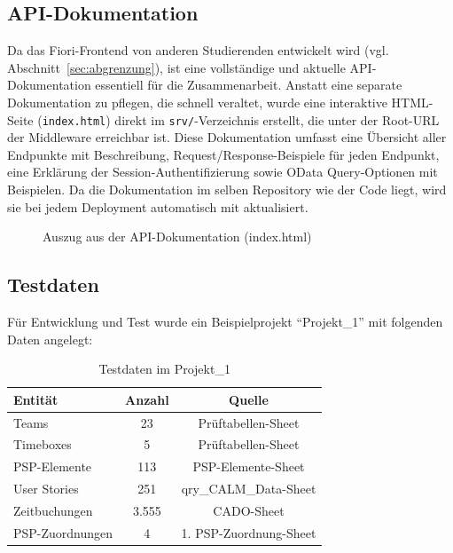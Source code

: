 \subsection{API-Dokumentation}

Da das Fiori-Frontend von anderen Studierenden entwickelt wird (vgl. Abschnitt~\ref{sec:abgrenzung}), ist eine vollständige und aktuelle API-Dokumentation essentiell für die Zusammenarbeit. Anstatt eine separate Dokumentation zu pflegen, die schnell veraltet, wurde eine interaktive HTML-Seite (\texttt{index.html}) direkt im \texttt{srv/}-Verzeichnis erstellt, die unter der Root-URL der Middleware erreichbar ist. Diese Dokumentation umfasst eine Übersicht aller Endpunkte mit Beschreibung, Request/Response-Beispiele für jeden Endpunkt, eine Erklärung der Session-Authentifizierung sowie OData Query-Optionen mit Beispielen. Da die Dokumentation im selben Repository wie der Code liegt, wird sie bei jedem Deployment automatisch mit aktualisiert.

\begin{figure}[H]
\centering
{}
\caption{Auszug aus der API-Dokumentation (index.html)}
\label{fig:api-doc}
\end{figure}

\subsection{Testdaten}

Für Entwicklung und Test wurde ein Beispielprojekt \enquote{Projekt\_1} mit folgenden Daten angelegt:

\begin{table}[H]
\centering
\caption{Testdaten im Projekt\_1}
\label{tab:testdata}
\begin{tabularx}{\textwidth}{Xcc}
\toprule
\textbf{Entität} & \textbf{Anzahl} & \textbf{Quelle} \\
\midrule
Teams & 23 & Prüftabellen-Sheet \\
Timeboxes & 5 & Prüftabellen-Sheet \\
PSP-Elemente & 113 & PSP-Elemente-Sheet \\
User Stories & 251 & qry\_CALM\_Data-Sheet \\
Zeitbuchungen & 3.555 & CADO-Sheet \\
PSP-Zuordnungen & 4 & 1. PSP-Zuordnung-Sheet \\
\bottomrule
\end{tabularx}
\end{table}


